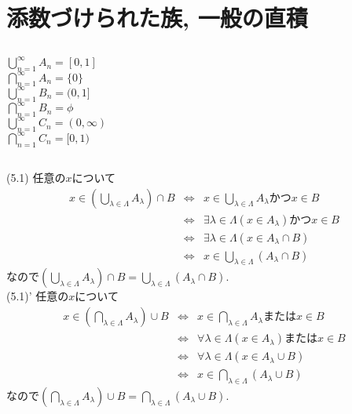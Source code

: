 \documentclass{jsarticle}
\begin{document}
\section{添数づけられた族, 一般の直積}	%
\subsection{} %
\noindent
$\bigcup_{n = 1}^{\infty}A_n = [0, 1]$\\
$\bigcap_{n = 1}^{\infty}A_n = \{0\}$\\
$\bigcup_{n = 1}^{\infty}B_n = (0, 1]$\\
$\bigcap_{n = 1}^{\infty}B_n = \phi$\\
$\bigcup_{n = 1}^{\infty}C_n = (0, \infty)$\\
$\bigcap_{n = 1}^{\infty}C_n = [0, 1)$

\subsection{} %
\noindent
(5.1) 任意の$x$について
\begin{eqnarray*}
	x \in (\bigcup_{\lambda \in \Lambda}A_\lambda) \cap B
	&\Leftrightarrow& x \in \bigcup_{\lambda \in \Lambda}A_\lambda かつ x \in B\\
	&\Leftrightarrow& \exists \lambda \in \Lambda (x \in A_\lambda) かつ x \in B\\
	&\Leftrightarrow& \exists \lambda \in \Lambda(x \in A_\lambda \cap B)\\
	&\Leftrightarrow& x \in \bigcup_{\lambda \in \Lambda}(A_\lambda \cap B)
\end{eqnarray*}
なので$(\bigcup_{\lambda \in \Lambda}A_\lambda) \cap B = \bigcup_{\lambda \in \Lambda}(A_\lambda \cap B)$.\\
(5.1)' 任意の$x$について
\begin{eqnarray*}
	x \in \left(\bigcap_{\lambda \in \Lambda}A_\lambda\right) \cup B
	&\Leftrightarrow& x \in \bigcap_{\lambda \in \Lambda}A_\lambda または x \in B\\
	&\Leftrightarrow& \forall{\lambda \in \Lambda}(x \in A_\lambda) または x \in B\\
	&\Leftrightarrow& \forall{\lambda \in \Lambda}(x \in A_\lambda \cup B)\\
	&\Leftrightarrow& x \in \bigcap_{\lambda \in \Lambda}(A_\lambda \cup B)
\end{eqnarray*}
なので$(\bigcap_{\lambda \in \Lambda}A_\lambda) \cup B = \bigcap_{\lambda \in \Lambda}(A_\lambda \cup B)$.
\end{document}
